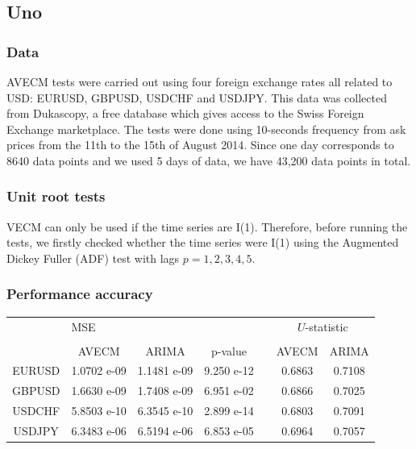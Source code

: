 \documentclass[compress,red]{beamer}
\begin{document}
\subsection{Uno}
\begin{frame}
\frametitle{Data}
AVECM tests were carried out using four foreign exchange rates all related to
USD: EURUSD, GBPUSD, USDCHF and USDJPY. This data was collected from Dukascopy, a free
database which gives access to the Swiss Foreign Exchange marketplace.
The tests were done using 10-seconds frequency from ask prices
from the 11th to the 15th of August 2014. Since one day corresponds to 8640 data points and we used 5 days of data, we have 43,200 data points in total.
\end{frame}

\begin{frame}
\frametitle{Unit root tests}
VECM can only be used if the time series are I(1). Therefore, 
before running the tests, we firstly checked whether the time series were
I(1) using the Augmented Dickey Fuller (ADF) test with lags $p=1,2,3,4,5$.
\end{frame}

\begin{frame}
\frametitle{Performance accuracy}
\small
\begin{tabular}{ccccccc}
& \multicolumn{3}{l}{MSE} & &
\multicolumn{2}{c}{$U$-statistic} \\ 
\hhline{~---~--} \\
 & AVECM & ARIMA & p-value & &
AVECM & ARIMA \\ 

\hline
 EURUSD & 1.0702 e-09 & 1.1481 e-09 &  9.250 e-12 & & 0.6863 & 0.7108\\
 GBPUSD & 1.6630 e-09 & 1.7408 e-09 &  6.951 e-02 & & 0.6866 & 0.7025\\
 USDCHF & 5.8503 e-10 & 6.3545 e-10 &  2.899 e-14 & & 0.6803 & 0.7091\\
 USDJPY  & 6.3483 e-06 & 6.5194 e-06 &  6.853 e-05 & & 0.6964 & 0.7057
 \end{tabular}
 \end{frame}
\end{document}
